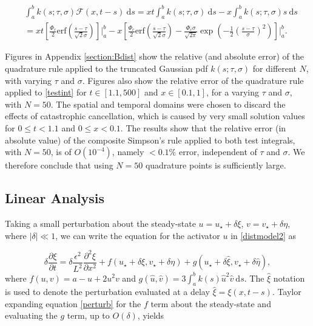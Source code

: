 \begin{equation}
    \begin{split}
&\int_a^bk(s;\tau,\sigma)\mathcal{F}(x,t-s)\ \text{d}s=xt\int_a^bk(s;\tau,\sigma)\ \text{d}s-x\int_a^bk(s;\tau,\sigma)s\ \text{d}s\\&=xt\left[\frac{\Phi_c}{2}\text{erf}\left(\frac{s-\tau}{\sqrt{2}\sigma}\right)\right]\bigg|_a^b-x\left[\frac{\Phi_c}{2}\text{erf}\left(\frac{s-\tau}{\sqrt{2}\sigma}\right)-\frac{\Phi_c\sigma}{\sqrt{2\pi}}\exp\left(-\frac{1}{2}\left(\frac{s-\tau}{\sigma}\right)^2 \right)\right]\Bigg|_a^b.
    \end{split}
\end{equation}

Figures in Appendix \ref{section:Bdist} show the relative (and absolute error) of the quadrature rule applied to the truncated Gaussian pdf $k(s;\tau,\sigma)$ for different $N$, with varying $\tau$ and $\sigma$. Figures also show the relative error of the quadrature rule applied to \eqref{testint} for $t\in[1.1,500]$ and $x\in[0.1,1]$, for a varying $\tau$ and $\sigma$, with $N=50$. The spatial and temporal domains were chosen to discard the effects of catastrophic cancellation, which is caused by very small solution values for $0\leq t<1.1$ and $0\leq x<0.1$. The results show that the relative error (in absolute value) of the composite Simpson's rule applied to both test integrals, with $N=50$, is of $O(10^{-4})$, namely $<0.1\%$ error, independent of $\tau$ and $\sigma$. We therefore conclude that using $N=50$ quadrature points is sufficiently large.


\subsection{Linear Analysis}\label{section:distlin}
Taking a small perturbation about the steady-state $u=u_\star+\delta\xi$, $v=v_\star+\delta\eta$, where $|\delta|\ll1$, we can write the equation for the activator $u$ in \eqref{distmodel2} as

\begin{equation}\label{perturb}
  \delta\frac{\partial \xi}{\partial t}=\delta \frac{\epsilon^2}{L^2}\frac{\partial^2\xi}{\partial x^2}+f(u_\star+\delta\xi, v_\star+\delta\eta)+g(u_\star+\delta\hat{\xi},v_\star+\delta\hat{\eta}) ,
\end{equation}
where $f(u,v)=a-u+2u^2v$ and $g(\hat{u},\hat{v})=3\int_a^bk(s)\hat{u}^2\hat{v}\ \text{d}s$. The $\hat{\xi}$ notation is used to denote the perturbation evaluated at a delay $\hat{\xi}=\xi(x,t-s)$. Taylor expanding equation \eqref{perturb} for the $f$ term about the steady-state and evaluating the $g$ term, up to $O(\delta)$, yields

